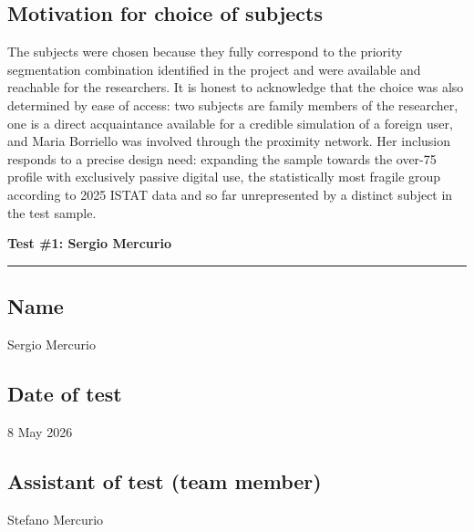 ﻿\documentclass[11pt,a4paper]{article}
\begin{document}
\subsection*{Motivation for choice of subjects}
\label{sec:recruitment-motivation-client}
\begin{tcolorbox}[base]
The subjects were chosen because they fully correspond
to the priority segmentation combination identified
in the project and were available and reachable for the
researchers. It is honest to acknowledge that the choice was
also determined by ease of access: two subjects
are family members of the researcher, one is a direct
acquaintance available for a credible simulation of a
foreign user, and Maria Borriello was involved
through the proximity network. Her inclusion responds
to a precise design need: expanding the sample
towards the over-75 profile with exclusively passive
digital use, the statistically most fragile group according
to 2025 ISTAT data and so far unrepresented by a distinct
subject in the test sample.
\end{tcolorbox}


\newpage
\begin{center}
  {\color{primaryColor}\large\bfseries Test \#1: Sergio Mercurio}\\
  \vspace{0.1cm}
  \color{borderColor}\hrule
\end{center}

\vspace{0.5cm}

\subsection*{Name}
\begin{tcolorbox}[base]
Sergio Mercurio
\end{tcolorbox}

\subsection*{Date of test}
\begin{tcolorbox}[base]
8 May 2026
\end{tcolorbox}

\subsection*{Assistant of test (team member)}
\begin{tcolorbox}[base]
Stefano Mercurio
\end{tcolorbox}
\end{document}
